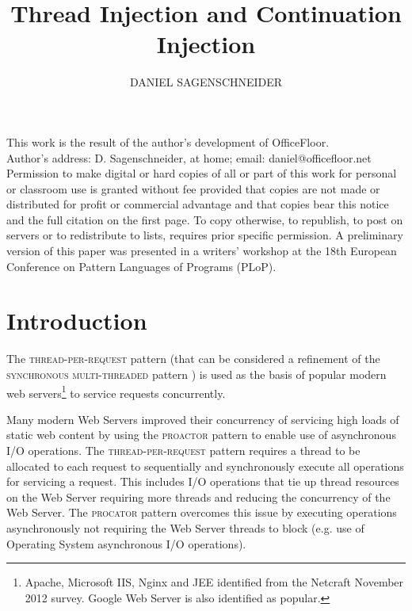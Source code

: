 \documentclass[prodmode]{style/acmlarge}
\title{Thread Injection and Continuation Injection}
\author{DANIEL SAGENSCHNEIDER \affil{daniel@officefloor.net}}
\begin{document}
\begin{bottomstuff}
This work is the result of the author's development of OfficeFloor.\\
Author's address: D. Sagenschneider, at home; email: daniel@officefloor.net\\

Permission to make digital or hard copies of all or part of this work for
personal or classroom use is granted without fee provided that copies are not
made or distributed for profit or commercial advantage and that copies bear this
notice and the full citation on the first page. To copy otherwise, to republish,
to post on servers or to redistribute to lists, requires prior specific
permission. A preliminary version of this paper was presented in a writers'
workshop at the 18th European Conference on Pattern Languages of Programs
(PLoP).
\end{bottomstuff}

\maketitle


\section{Introduction}


The \textsc{thread-per-request} pattern \cite{thread-per-request} (that can be
considered a refinement of the \textsc{synchronous multi-threaded} pattern
\cite{proactor}) is used as the basis of popular modern web
servers\footnote{Apache, Microsoft IIS, Nginx and JEE identified from the
Netcraft November 2012 survey.  Google Web Server is also identified as
popular.} to service requests concurrently.

Many modern Web Servers improved their concurrency of servicing high loads of
static web content by using the \textsc{proactor} pattern \cite{proactor} to
enable use of asynchronous I/O operations.  The \textsc{thread-per-request}
pattern requires a thread to be allocated to each request to sequentially and
synchronously execute all operations for servicing a request.  This includes I/O
operations that tie up thread resources on the Web Server requiring more threads
and reducing the concurrency of the Web Server.  The \textsc{procator} pattern
overcomes this issue by executing operations asynchronously not requiring the
Web Server threads to block (e.g. use of Operating System asynchronous I/O
operations).
\end{document}
